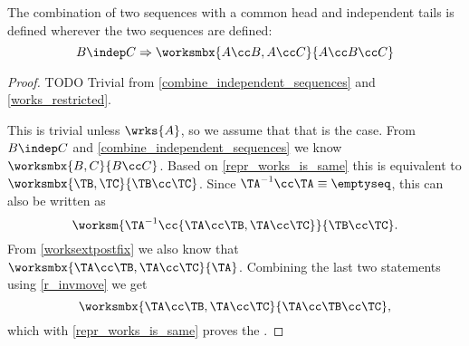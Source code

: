 \begin{mylem}
The combination of two sequences with a common head and independent tails 
is defined wherever the two sequences are defined:
\[ B\indep C \Rightarrow \worksmbx{A\cc B, A\cc C}{A\cc B\cc C} \]
\end{mylem}
\begin{proof}
TODO Trivial from \cref{combine_independent_sequences} and \cref{works_restricted}.

This is trivial unless $\wrks{A}$, so we assume that that is the case.
From $B\indep C$ and \cref{combine_independent_sequences} we know
$\worksmbx{B, C}{B\cc C}$.
Based on \cref{repr_works_is_same} this is equivalent to
$\worksmbx{\TB, \TC}{\TB\cc \TC}$.
Since $\TA^{-1}\cc \TA \equiv \emptyseq$, this can also be written as
\[\worksm{\TA^{-1}\cc\{\TA\cc \TB, \TA\cc \TC\}}{\TB\cc \TC}.\]
From \cref{worksextpostfix} we also know that
$\worksmbx{\TA\cc \TB, \TA\cc \TC}{\TA}$.
Combining the last two statements using \cref{r_invmove}
we get
\[ \worksmbx{\TA\cc \TB, \TA\cc \TC}{\TA\cc \TB\cc \TC}, \]
which with \cref{repr_works_is_same} proves the
.
\end{proof}
